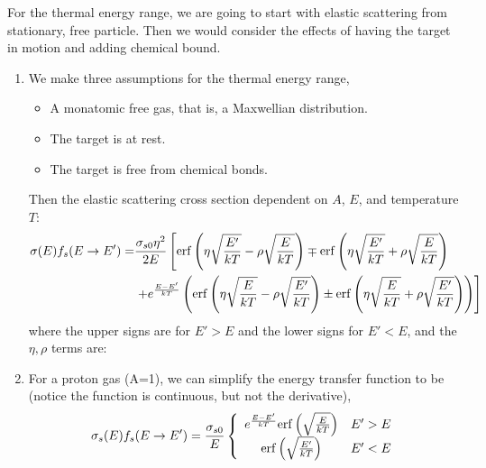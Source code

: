\documentclass{school-22.211-notes}
\begin{document}
\clearpage
{}
For the thermal energy range, we are going to start with elastic scattering from stationary, free particle. Then we would consider the effects of having the target in motion and adding chemical bound.
\begin{enumerate}
\item We make three assumptions for the thermal energy range, 
  \begin{itemize}
  \item A monatomic free gas, that is, a Maxwellian distribution. 
  \item The target is at rest. 
  \item The target is free from chemical bonds. 
  \end{itemize}

Then the elastic scattering cross section dependent on $A$, $E$, and temperature $T$:
\begin{align}
  \sigma(E) f_s (E \to E') = &\frac{\sigma_{s0} \eta^2}{2E} \left[ \mathrm{erf}\left( \eta \sqrt{\frac{E'}{kT}} - \rho \sqrt{\frac{E}{kT}}  \right) \mp \mathrm{erf}\left( \eta \sqrt{\frac{E'}{kT}} + \rho \sqrt{\frac{E}{kT}}  \right) \right. \notag \\
    & \left. + e^{\frac{E - E'}{kT}} \left( \mathrm{erf}\left(  \eta \sqrt{\frac{E}{kT}} - \rho \sqrt{\frac{E'}{kT}}  \right)  \pm \mathrm{erf}\left( \eta \sqrt{\frac{E}{kT}} + \rho \sqrt{\frac{E'}{kT}}  \right) \right) \right] 
\end{align}
where the upper signs are for $E' > E$ and the lower signs for $E' < E$, and the $\eta, \rho$ terms are:

\item For a proton gas (A=1), we can simplify the energy transfer function to be (notice the function is continuous, but not the derivative),
\begin{align}
\sigma_s(E) f_s(E\to E') = \frac{\sigma_{s0}}{E} \left\{ 
\begin{array}{cc}
e^{\frac{E-E'}{kT}} \mathrm{erf}\left( \sqrt{\frac{E}{kT}} \right) & E' > E \\
\mathrm{erf}\left( \sqrt{\frac{E'}{kT}} \right) & E' < E 
\end{array}
\right.
\end{align}


\end{enumerate}
\end{document}
